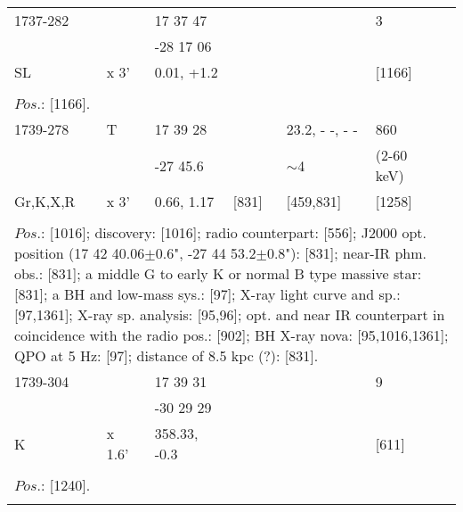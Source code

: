 \documentclass{aa}
\begin{document}
\begin{tabular}{p{2.5cm}p{1cm}p{1.8cm}p{2.3cm}p{3.3cm}p{2.0cm}p{2.2cm}}
\noalign{\smallskip}
1737-282        &                & 17 37 47              &                    &                          & 3                 &          \\
                         &                & -28 17 06             &                    &                          &                    &         \\
SL                    & x 3'         & 0.01, +1.2            &                    &                          & [1166]       &         \\
\\
\multicolumn{7}{p{17.5cm}}{
$Pos$.: [1166].}\\
\noalign{\smallskip}
\hline

\noalign{\smallskip}
1739-278     & T            & 17 39 28     &                 & 23.2, - -, - -         & 860                     &        \\
                      &                & -27 45.6      &                &  $\sim$4             & (2-60 keV)         &         \\
Gr,K,X,R     & x 3'          & 0.66, 1.17   & [831]      & [459,831]            & [1258]                &        \\
\\
\multicolumn{7}{p{17.5cm}}{
$Pos$.: [1016]; discovery: [1016]; radio counterpart: [556]; J2000 opt. position (17 42 40.06$\pm$0.6", 
-27 44 53.2$\pm$0.8"): [831]; near-IR phm. obs.: [831]; a middle G to early K or normal B type massive star: [831]; a BH 
and low-mass sys.: [97]; X-ray light curve and sp.: [97,1361]; X-ray sp. analysis: [95,96]; opt. and near IR counterpart in 
coincidence with the radio pos.: [902]; BH X-ray nova: [95,1016,1361]; QPO at 5 Hz: [97]; distance of 8.5 kpc (?): [831].}\\
\noalign{\smallskip}
\hline

\noalign{\smallskip}
1739-304        &               & 17 39 31              &                   &                             & 9                              &          \\
                         &               & -30 29 29             &                   &                             &                                 &         \\
K                      & x 1.6'     & 358.33, -0.3         &                   &                             & [611]                       &          \\
\\
\multicolumn{7}{p{17.5cm}}{
$Pos$.: [1240].}\\
\noalign{\smallskip}
\hline


\end{tabular}
\end{document}
